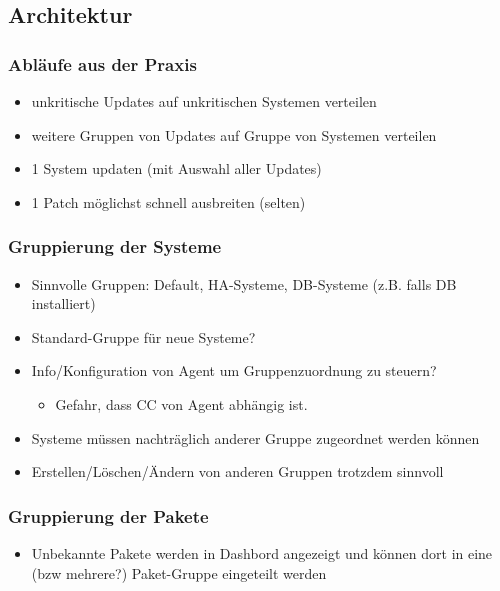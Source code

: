 \documentclass[class=scrbook,crop=false]{standalone}
\begin{document}
    \subsection*{Architektur}
    
    \subsubsection*{Abläufe aus der Praxis}
    
    \begin{itemize}
        \item unkritische Updates auf unkritischen Systemen verteilen
        \item weitere Gruppen von Updates auf Gruppe von Systemen verteilen
        \item 1 System updaten (mit Auswahl aller Updates)
        \item 1 Patch möglichst schnell ausbreiten (selten)
    \end{itemize}
    
    \subsubsection{Gruppierung der Systeme}
    
    \begin{itemize}
        \item Sinnvolle Gruppen: Default, HA-Systeme, DB-Systeme (z.B. falls DB installiert)
        \item Standard-Gruppe für neue Systeme?
        \item Info/Konfiguration von Agent um Gruppenzuordnung zu steuern?
        \begin{itemize}
            \item Gefahr, dass CC von Agent abhängig ist.
        \end{itemize}
        \item Systeme müssen nachträglich anderer Gruppe zugeordnet werden können
        \item Erstellen/Löschen/Ändern von anderen Gruppen trotzdem sinnvoll
    \end{itemize}
    
    \subsubsection{Gruppierung der Pakete}
    
    \begin{itemize}
        \item Unbekannte Pakete werden in Dashbord angezeigt und können dort in eine (bzw mehrere?) Paket-Gruppe eingeteilt werden
    \end{itemize}
    
\end{document}
